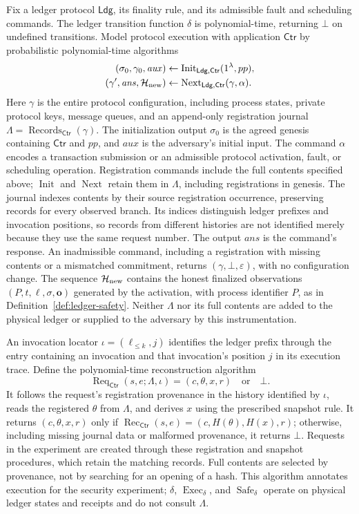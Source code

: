 \documentclass[10pt,letterpaper]{article}
\newcommand{\Ldg}{\mathsf{Ldg}}
\newcommand{\Ctr}{\mathsf{Ctr}}
\begin{document}
Fix a ledger protocol $\Ldg$, its finality rule, and its admissible fault and scheduling commands. The ledger transition function $\delta$ is polynomial-time, returning $\bot$ on undefined transitions. Model protocol execution with application $\Ctr$ by probabilistic polynomial-time algorithms
\begin{align*}
 (\sigma_0,\gamma_0,\mathit{aux})&\leftarrow\operatorname{Init}_{\Ldg,\Ctr}(1^\lambda,pp),\\
 (\gamma',\mathit{ans},\mathcal H_{\rm new})&\leftarrow\operatorname{Next}_{\Ldg,\Ctr}(\gamma,\alpha).
\end{align*}
Here $\gamma$ is the entire protocol configuration, including process states, private protocol keys, message queues, and an append-only registration journal $\Lambda=\operatorname{Records}_{\Ctr}(\gamma)$. The initialization output $\sigma_0$ is the agreed genesis containing $\Ctr$ and $pp$, and $\mathit{aux}$ is the adversary's initial input. The command $\alpha$ encodes a transaction submission or an admissible protocol activation, fault, or scheduling operation. Registration commands include the full contents specified above; $\operatorname{Init}$ and $\operatorname{Next}$ retain them in $\Lambda$, including registrations in genesis. The journal indexes contents by their source registration occurrence, preserving records for every observed branch. Its indices distinguish ledger prefixes and invocation positions, so records from different histories are not identified merely because they use the same request number. The output $\mathit{ans}$ is the command's response. An inadmissible command, including a registration with missing contents or a mismatched commitment, returns $(\gamma,\bot,\varepsilon)$, with no configuration change. The sequence $\mathcal H_{\rm new}$ contains the honest finalized observations $(P,t,\ell,\sigma,\mathbf o)$ generated by the activation, with process identifier $P$, as in Definition~\ref{def:ledger-safety}. Neither $\Lambda$ nor its full contents are added to the physical ledger or supplied to the adversary by this instrumentation.

An invocation locator $\iota=(\ell_{\leq k},j)$ identifies the ledger prefix through the entry containing an invocation and that invocation's position $j$ in its execution trace. Define the polynomial-time reconstruction algorithm
\[
 \operatorname{Req}_{\Ctr}(s,e;\Lambda,\iota)
 =(c,\theta,x,r)\quad\text{or}\quad\bot.
\]
It follows the request's registration provenance in the history identified by $\iota$, reads the registered $\theta$ from $\Lambda$, and derives $x$ using the prescribed snapshot rule. It returns $(c,\theta,x,r)$ only if $\operatorname{Rec}_{\Ctr}(s,e)=(c,H(\theta),H(x),r)$; otherwise, including missing journal data or malformed provenance, it returns $\bot$. Requests in the experiment are created through these registration and snapshot procedures, which retain the matching records. Full contents are selected by provenance, not by searching for an opening of a hash. This algorithm annotates execution for the security experiment; $\delta$, $\operatorname{Exec}_\delta$, and $\operatorname{Safe}_\delta$ operate on physical ledger states and receipts and do not consult $\Lambda$.
\end{document}

